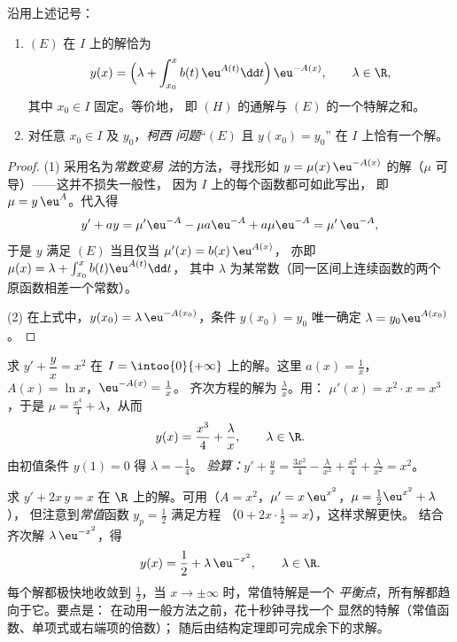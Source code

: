 \begin{theorem}\label{thm:b1:diffeq:voc}
沿用上述记号：
\begin{enumerate}
  \item $(E)$ 在 $I$ 上的解恰为
        \[
        y(x) = \Bigl(\lambda + \int_{x_0}^{x} b(t)\, \eu^{A(t)} \dd t
        \Bigr)\, \eu^{-A(x)},
        \qquad \lambda \in \R,
        \]
        其中 $x_0 \in I$ 固定。等价地，
        即 $(H)$ 的通解与 $(E)$ 的一个特解之和。
  \item 对任意 $x_0 \in I$ 及 $y_0$，\emph{柯西
        问题}“$(E)$ 且 $y(x_0) = y_0$”
        在 $I$ 上恰有一个解。
\end{enumerate}
\end{theorem}

\begin{proof}
(1) 采用名为\emph{常数变易
法}的方法，寻找形如
$y = \mu(x)\, \eu^{-A(x)}$ 的解（$\mu$ 可导）——这并不损失一般性，
因为 $I$ 上的每个函数都可如此写出，
即 $\mu = y\,\eu^{A}$。代入得
\[
y' + ay = \mu' \eu^{-A} - \mu a \eu^{-A} + a\mu\eu^{-A}
= \mu'\, \eu^{-A},
\]
于是 $y$ 满足 $(E)$ 当且仅当 $\mu'(x) = b(x)\,\eu^{A(x)}$，
亦即 $\mu(x) = \lambda + \int_{x_0}^x b(t)\eu^{A(t)}\dd t$，
其中 $\lambda$ 为某常数（同一区间上连续函数的两个
原函数相差一个常数）。

(2) 在上式中，$y(x_0) = \lambda\,\eu^{-A(x_0)}$，条件
$y(x_0) = y_0$ 唯一确定 $\lambda = y_0 \eu^{A(x_0)}$。
\end{proof}

\begin{example}\label{ex:b1:diffeq:order1}
求 $y' + \dfrac{y}{x} = x^2$ 在 $I = \intoo{0}{+\infty}$ 上的解。这里
$a(x) = \frac 1x$，$A(x) = \ln x$，$\eu^{-A(x)} = \frac 1x$。
齐次方程的解为 $\frac{\lambda}{x}$。用：
$\mu'(x) = x^2 \cdot x = x^3$，于是 $\mu = \frac{x^4}{4} + \lambda$，从而
\[
y(x) = \frac{x^3}{4} + \frac{\lambda}{x}, \qquad \lambda \in \R .
\]
由初值条件 $y(1) = 0$ 得 $\lambda = -\frac14$。
\emph{验算：}$y' + \frac yx = \frac{3x^2}{4} - \frac{\lambda}{x^2} +
\frac{x^2}{4} + \frac{\lambda}{x^2} = x^2$。
\end{example}

\begin{example}[猜测胜过积分]\label{ex:b1:diffeq:guess}
求 $y' + 2x\,y = x$ 在 $\R$ 上的解。可用（$A =
x^2$，$\mu' = x\,\eu^{x^2}$，$\mu = \frac12\eu^{x^2} + \lambda$），
但注意到\emph{常值}函数 $y_p = \frac12$ 满足方程
（$0 + 2x\cdot\frac12 = x$），这样求解更快。
结合齐次解 $\lambda\,\eu^{-x^2}$，得
\[
y(x) = \frac12 + \lambda\,\eu^{-x^2}, \qquad \lambda \in \R .
\]
每个解都极快地收敛到 $\frac12$，当 $x \to
\pm\infty$ 时，常值特解是一个
\emph{平衡点}，所有解都趋向于它。要点是：
在动用一般方法之前，花十秒钟寻找一个
显然的特解（常值函数、单项式或右端项的倍数）；
随后由结构定理即可完成余下的求解。
\end{example}

